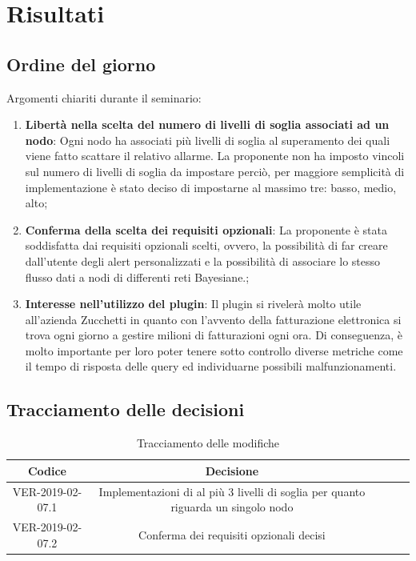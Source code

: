 \documentclass{article}
\begin{document}
\section{Risultati}
    \subsection{Ordine del giorno}
    Argomenti chiariti durante il seminario:
    \begin{enumerate}
        \item \textbf{Libertà nella scelta del numero di livelli di soglia associati ad un nodo}: Ogni nodo ha associati più livelli di soglia al superamento dei quali viene fatto scattare il relativo allarme. La proponente non ha imposto vincoli sul numero di livelli di soglia da impostare perciò, per maggiore semplicità di implementazione è stato deciso di impostarne al massimo tre: basso, medio, alto;
        \item \textbf{Conferma della scelta dei requisiti opzionali}: La proponente è stata soddisfatta dai requisiti opzionali scelti, ovvero, la possibilità di far creare dall'utente degli alert personalizzati e la possibilità di associare lo stesso flusso dati a nodi di differenti reti Bayesiane.;
        \item \textbf{Interesse nell'utilizzo del plugin}: Il plugin si rivelerà molto utile all'azienda Zucchetti in quanto con l'avvento della fatturazione elettronica si trova ogni giorno a gestire milioni di fatturazioni ogni ora. Di conseguenza, è molto importante per loro poter tenere sotto controllo diverse metriche come il tempo di risposta delle query ed individuarne possibili malfunzionamenti.
    \end{enumerate}
    
    \subsection{Tracciamento delle decisioni}
    \begin{table}[!h] %
            \centering
            \renewcommand{\arraystretch}{2}
            \begin{tabular}{|c|c|p{6cm}|l|l|} %
                \rowcolor{orange!50} %
        		\hline
        		\textbf{Codice} & \textbf{Decisione}\\
                \hline
                VER-2019-02-07.1 & Implementazioni di al più 3 livelli di soglia per quanto riguarda un singolo nodo\\
                \hline
                VER-2019-02-07.2 & Conferma dei requisiti opzionali decisi\\
                \hline
        \end{tabular}
        \caption{Tracciamento delle modifiche} %
        \label{tab:Tracciamento delle modifiche}
        \end{table}
    
\end{document}
